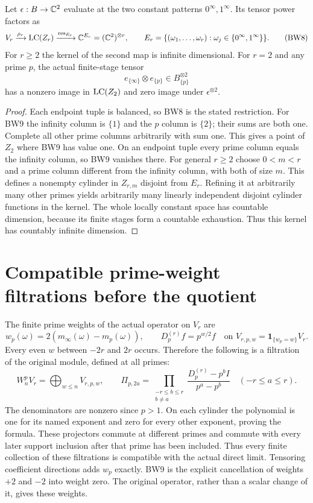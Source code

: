 \begin{proposition}
Let $\epsilon:B\to\mathbb C^2$ evaluate at the two constant patterns
$0^\infty,1^\infty$. Its tensor power factors as
\[
 V_r\xrightarrow{\rho_r}\operatorname{LC}(Z_r)
 \xrightarrow{\operatorname{res}_{E_r}}\mathbb C^{E_r}
       =(\mathbb C^2)^{\otimes r},\qquad
 E_r=\{(\omega_1,\ldots,\omega_r):
              \omega_j\in\{0^\infty,1^\infty\}\}.
 \tag{BW8}
\]
For $r\ge2$ the kernel of the second map is infinite dimensional.
For $r=2$ and any prime $p$, the actual finite-stage tensor
\[
 e_{\{\infty\}}\otimes e_{\{p\}}\in B_{\{p\}}^{\otimes2}
 \tag{BW9}
\]
has a nonzero image in $\operatorname{LC}(Z_2)$ and zero image under
$\epsilon^{\otimes2}$.
\end{proposition}
\begin{proof}
Each endpoint tuple is balanced, so BW8 is the stated restriction.
For BW9 the infinity column is $\{1\}$ and the $p$ column is
$\{2\}$; their sums are both one. Complete all other prime columns
arbitrarily with sum one. This gives a point of $Z_2$ where BW9
has value one. On an endpoint tuple every prime column equals the
infinity column, so BW9 vanishes there.
For general $r\ge2$ choose $0<m<r$ and a prime column different
from the infinity column, with both of size $m$. This defines a
nonempty cylinder in $Z_{r,m}$ disjoint from $E_r$. Refining it at
arbitrarily many other primes yields arbitrarily many linearly
independent disjoint cylinder functions in the kernel. The whole
locally constant space has countable dimension, because its finite
stages form a countable exhaustion. Thus this kernel has countably
infinite dimension.
\end{proof}

\section{Compatible prime-weight filtrations before the quotient}
The finite prime weights of the actual operator on $V_r$ are
\[
 w_p(\omega)=2(m_\infty(\omega)-m_p(\omega)),\qquad
 D_p^{(r)}f=p^{w/2}f
 \quad\text{on }V_{r,p,w}=\mathbf1_{\{w_p=w\}}V_r.
 \tag{BW10}
\]
Every even $w$ between $-2r$ and $2r$ occurs. Therefore the following
is a filtration of the original module, defined at all primes:
\[
 W_n^pV_r=\bigoplus_{w\le n}V_{r,p,w},\qquad
 \Pi_{p,2a}=\prod_{\substack{-r\le b\le r\\b\ne a}}
       \frac{D_p^{(r)}-p^bI}{p^a-p^b}\quad(-r\le a\le r).
 \tag{BW11}
\]
The denominators are nonzero since $p>1$. On each cylinder the
polynomial is one for its named exponent and zero for every other
exponent, proving the formula. These projectors commute at different
primes and commute with every later support inclusion after that
prime has been included. Thus every finite collection of these
filtrations is compatible with the actual direct limit. Tensoring
coefficient directions adds $w_p$ exactly. BW9 is the explicit
cancellation of weights $+2$ and $-2$ into weight zero. The original
operator, rather than a scalar change of it, gives these weights.

